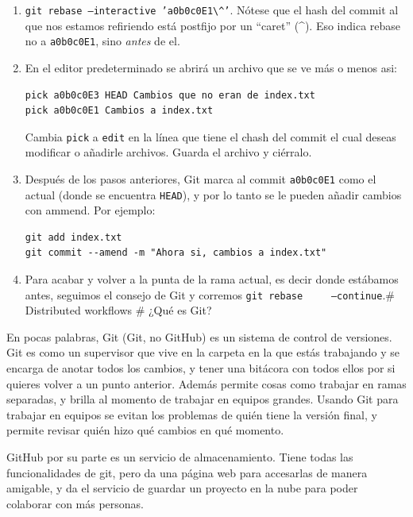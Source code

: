 \documentclass[spanish, 12pt, a4paper]{article}
\begin{document}
\begin{enumerate}
\def\labelenumi{\arabic{enumi}.}
\item
  \passthrough{\lstinline!git rebase –interactive ’a0b0c0E1\^’!}. Nótese
  que el hash del commit al que nos estamos refiriendo está postfijo por
  un ``caret'' (\^{}). Eso indica rebase no a
  \passthrough{\lstinline!a0b0c0E1!}, sino \emph{antes} de el.
\item
  En el editor predeterminado se abrirá un archivo que se ve más o menos
  asi:

\begin{lstlisting}
pick a0b0c0E3 HEAD Cambios que no eran de index.txt
pick a0b0c0E1 Cambios a index.txt
\end{lstlisting}

  Cambia \passthrough{\lstinline!pick!} a \passthrough{\lstinline!edit!}
  en la línea que tiene el chash del commit el cual deseas modificar o
  añadirle archivos. Guarda el archivo y ciérralo.
\item
  Después de los pasos anteriores, Git marca al commit
  \passthrough{\lstinline!a0b0c0E1!} como el actual (donde se encuentra
  \passthrough{\lstinline!HEAD!}), y por lo tanto se le pueden añadir
  cambios con ammend. Por ejemplo:

\begin{lstlisting}
git add index.txt
git commit --amend -m "Ahora si, cambios a index.txt"
\end{lstlisting}
\item
  Para acabar y volver a la punta de la rama actual, es decir donde
  estábamos antes, seguimos el consejo de Git y corremos
  \passthrough{\lstinline!git rebase     –continue!}.\# Distributed
  workflows \# ¿Qué es Git?
\end{enumerate}

En pocas palabras, Git (Git, no GitHub) es un sistema de control de
versiones. Git es como un supervisor que vive en la carpeta en la que
estás trabajando y se encarga de anotar todos los cambios, y tener una
bitácora con todos ellos por si quieres volver a un punto anterior.
Además permite cosas como trabajar en ramas separadas, y brilla al
momento de trabajar en equipos grandes. Usando Git para trabajar en
equipos se evitan los problemas de quién tiene la versión final, y
permite revisar quién hizo qué cambios en qué momento.

GitHub por su parte es un servicio de almacenamiento. Tiene todas las
funcionalidades de git, pero da una página web para accesarlas de manera
amigable, y da el servicio de guardar un proyecto en la nube para poder
colaborar con más personas.
\end{document}
